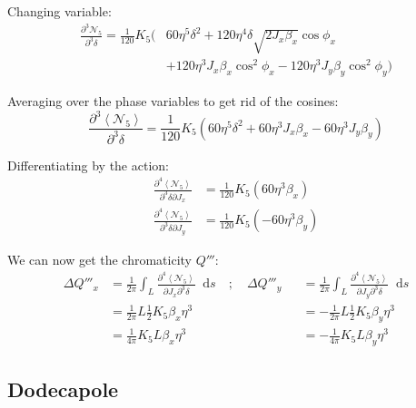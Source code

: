 \documentclass[12pt,a4,]{article}
\numberwithin{equation}{subsection}
\newcommand*\diff{\mathop{}\!\mathrm{d}}
\begin{document}
Changing variable: \begin{equation}\begin{aligned}
\frac{\partial^3 \mathcal{N_5}}{\partial^3 \delta} = \frac{1}{120} K_5 \biggl(& 60\eta^5\delta^2 + 120 \eta^4\delta \sqrt{2J_x\beta_x}\cos\phi_x\\
    &+ 120\eta^3 J_x\beta_x\cos^2\phi_x - 120\eta^3 J_y\beta_y\cos^2\phi_y\biggr)
\end{aligned}\end{equation}

Averaging over the phase variables to get rid of the cosines:
\begin{equation}\frac{\partial^3 \left<\mathcal{N_5}\right>}{\partial^3 \delta} = \frac{1}{120} K_5 \left( 60\eta^5\delta^2
  + 60\eta^3 J_x\beta_x- 60\eta^3 J_y\beta_y\right)\end{equation}

Differentiating by the action: \begin{equation}\begin{aligned}
\frac{\partial^4 \left<\mathcal{N}_5\right>}{\partial^3 \delta \partial J_x} &= \frac{1}{120} K_5 \left( 60 \eta^3 \beta_x \right) \\
\frac{\partial^4 \left<\mathcal{N}_5\right>}{\partial^3 \delta \partial J_y} &= \frac{1}{120} K_5 \left(- 60 \eta^3 \beta_y \right)
\end{aligned}\end{equation}

We can now get the chromaticity \(Q'''\):
\begin{equation}\begin{aligned}
\Delta Q'''_x &= \frac{1}{2\pi} \int_L \frac{\partial^4 \left< \mathcal{N_5} \right>}{\partial J_x \partial^3 \delta} \diff s \quad; \quad \Delta Q'''_y &&= \frac{1}{2\pi} \int_L \frac{\partial^4 \left< \mathcal{N_5} \right>}{\partial J_y \partial^3 \delta} \diff s \\
&= \frac{1}{2 \pi} L \frac{1}{2} K_5 \beta_x \eta^3  &&= - \frac{1}{2 \pi} L \frac{1}{2} K_5 \beta_y \eta^3 \\
&= \frac{1}{4 \pi}  K_5 L \beta_x \eta^3 &&= - \frac{1}{4 \pi}  K_5 L \beta_y \eta^3
\end{aligned}\end{equation}

\hypertarget{dodecapole-1}{%
\subsection{Dodecapole}\label{dodecapole-1}}
\end{document}
